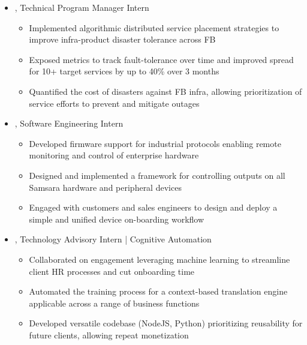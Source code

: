 \documentclass[11pt,letterpaper]{article}
\begin{document}
\begin{itemize}[label={}]
 \item \small{, Technical Program Manager Intern \hfill {}}
 \vspace{-1.58mm}
 \begin{itemize}[label={}]
    \item \small{Implemented algorithmic distributed service placement strategies to improve infra-product disaster tolerance across FB}
    \item \small{Exposed metrics to track fault-tolerance over time and improved spread for 10+ target services by up to 40\% over 3 months}
    \item \small{Quantified the cost of disasters against FB infra, allowing prioritization of service efforts to prevent and mitigate outages}
 \end{itemize}
 \item \small{, Software Engineering Intern \hfill {}}
 \vspace{-1.58mm}
 \begin{itemize}[label={}]
    \item \small{Developed firmware support for industrial protocols enabling remote monitoring and control of enterprise hardware}
    \item \small{Designed and implemented a framework for controlling outputs on all Samsara hardware and peripheral devices}
    \item \small{Engaged with customers and sales engineers to design and deploy a simple and unified device on-boarding workflow}
 \end{itemize}
 \item \small{, Technology Advisory Intern | Cognitive Automation  \hfill {}}
 \vspace{-1.58mm}
 \begin{itemize}[label={}]
    \item \small{Collaborated on engagement leveraging machine learning to streamline client HR processes and cut onboarding time}
    \item \small{Automated the training process for a context-based translation engine applicable across a range of business functions}
    \item \small{Developed versatile codebase (NodeJS, Python) prioritizing reusability for future clients, allowing repeat monetization}

\end{itemize}
\end{itemize}
\end{document}

